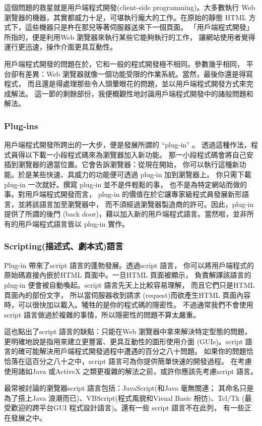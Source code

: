 這個問題的救星就是用戶端程式開發(client-side programming)。大多數執行
Web 瀏覽器的機器，其實都威力十足，可堪執行龐大的工作。在原始的靜態
HTML 方式下，這些機器只是杵在那兒等著伺服器送來下一個頁面。
「用戶端程式開發」所指的，便是利用Web 瀏覽器來執行某些它能夠執行的工作，
讓網站使用者覺得運行更迅速，操作介面更具互動性。

用戶端程式開發的問題在於，它和一般的程式開發極不相同。參數幾乎相同，
平台卻有差異：Web 瀏覽器就像一個功能受限的作業系統。當然，最後你還是得寫程式，
而且還是得處理那些令人頭暈眼花的問題，並以用戶端程式開發方式來完成解法。
這一節的剩餘部份，我便概觀性地討論用戶端程式開發中的諸般問題和解法。
\subsubsection{Plug-ins}
用戶端程式開發所跨出的一大步，便是發展所謂的 ``plug-in'' 。
透過這種作法，程式員得以下載一小段程式碼來為瀏覽器加入新功能。
那一小段程式碼會將自己安插到瀏覽器的適當位置。它會告訴瀏覽器：從現在開始，
你可以執行這種新功能。於是某些快速、具威力的功能便可透過 plug-in 加到瀏覽器上。
你只需下載 plug-in 一次就好。撰寫 plug-in 並不是件輕鬆的事，
也不是為特定網站而做的事。對用戶端程式開發而言，
plug-in 的價值在於它讓專家級程式員發展新形語言，並將該語言加至瀏覽器中，
而不須經過瀏覽器製造商的許可。因此，plug-in 提供了所謂的後門
(back door)，藉以加入新的用戶端程式語言。當然啦，並非所有的用戶端程式語言皆以
plug-in 實作。


\subsubsection{Scripting(描述式、劇本式)語言}
Plug-in 帶來了script 語言的蓬勃發展。透過script 語言，
你可以將用戶端程式的原始碼直接內嵌於HTML 頁面中。一旦HTML 頁面被顯示，
負責解譯該語言的plug-in 便會被自動喚起。script 語言先天上比較容易理解，
而且它們只是HTML 頁面內的部份文字， 所以當伺服器收到請求
(request)而欲產生HTML 頁面內容時，可以很快加以載入。犧牲的是你的程式碼的隱密性。
不過通常我們不會使用script 語言做過於複雜的事情，所以隱密性的問題不算太嚴重。

這也點出了script 語言的缺點：只能在Web 瀏覽器中拿來解決特定型態的問題，
更明確地說是指用來建立更豐富、更具互動性的圖形使用介面
(GUIs)。script 語言的確可能解決用戶端程式開發過程中遭遇的百分之八十問題。
如果你的問題恰恰落在這百分之八十之中，script 語言可為你提供簡單快速的開發過程。
在考慮使用諸如Java 或ActiveX 之類更複雜的解法之前，或許你應該先考慮script 語言。

最常被討論的瀏覽器script 語言包括：JavaScript(和Java 毫無關連；
其命名只是為了搭上Java 浪潮而已)、VBScript(程式風貌和Visual Basic 相彷)、Tcl/Tk
(最受歡迎的跨平台GUI 程式設計語言)。還有一些 script 語言不在此列，
有一些正在發展之中。 

